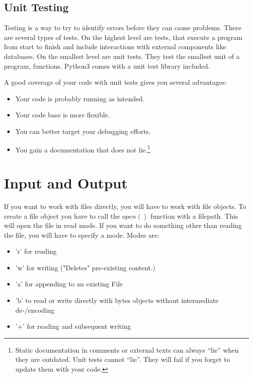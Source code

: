 \documentclass{article}
\newcommand{\qq}[1]{``#1''}
\begin{document}
\subsection{Unit Testing}

Testing is a way to try to identify errors before they can cause problems.
There are several types of tests.
On the highest level are tests, that execute a program from start to finish
and include interactions with external components like databases.
On the smallest level are unit tests.
They test the smallest unit of a program, functions.
Python3 comes with a unit test library included.

A good coverage of your code with unit tests gives you several advantages:

\begin{itemize}
    \item Your code is probably running as intended.
    \item Your code base is more flexible.
    \item You can better target your debugging efforts.
    \item You gain a documentation that does not lie.\footnote{
              Static documentation in comments or external texts can always
              \qq{lie} when they are outdated.
              Unit tests cannot \qq{lie}.
              They will fail if you forget to update them with your code.}
\end{itemize}



\section{Input and Output}

If you want to work with files directly, you will have to work with file objects.
To create a file object you have to call the $open()$ function with a filepath.
This will open the file in read mode.
If you want  to do something other than reading the file, you will have to specify a mode.
Modes are:

\begin{itemize}
    \item 'r' for reading
    \item 'w' for writing ("Deletes" pre-existing content.)
    \item 'a' for appending to an existing File
    \item 'b' to read or write directly with bytes objects without intermediate de-/encoding
    \item '+' for reading and subsequent writing
\end{itemize}
\end{document}
